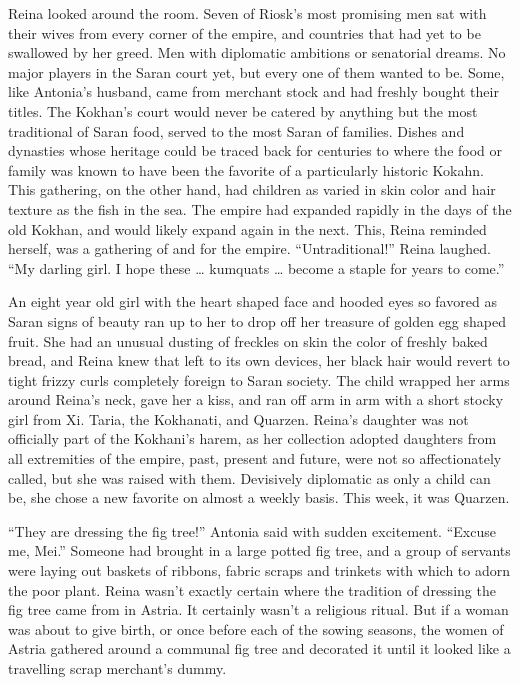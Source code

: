 \documentclass{article}
\begin{document}
	Reina looked around the room. Seven of Riosk’s most promising men sat with their wives from every corner of the empire, and countries that had yet to be swallowed by her greed. Men with diplomatic ambitions or senatorial dreams. No major players in the Saran court yet, but every one of them wanted to be. Some, like Antonia’s husband, came from merchant stock and had freshly bought their titles. The Kokhan’s court would never be catered by anything but the most traditional of Saran food, served to the most Saran of families. Dishes and dynasties whose heritage could be traced back for centuries to where the food or family was known to have been the favorite of a particularly historic Kokahn. This gathering, on the other hand, had children as varied in skin color and hair texture as the fish in the sea. The empire had expanded rapidly in the days of the old Kokhan, and would likely expand again in the next. This, Reina reminded herself, was a gathering of and for the empire. “Untraditional!” Reina laughed. “My darling girl. I hope these … kumquats … become a staple for years to come.”
	
	An eight year old girl with the heart shaped face and hooded eyes so favored as Saran signs of beauty ran up to her to drop off her treasure of golden egg shaped fruit. She had an unusual dusting of freckles on skin the color of freshly baked bread, and Reina knew that left to its own devices, her black hair would revert to tight frizzy curls completely foreign to Saran society. The child wrapped her arms around Reina’s neck, gave her a kiss, and ran off arm in arm with a short stocky girl from Xi. Taria, the Kokhanati, and Quarzen. Reina’s daughter was not officially part of the Kokhani’s harem, as her collection adopted daughters from all extremities of the empire, past, present and future, were not so affectionately called, but she was raised with them. Devisively diplomatic as only a child can be, she chose a new favorite on almost a weekly basis. This week, it was Quarzen.
	
	“They are dressing the fig tree!” Antonia said with sudden excitement. “Excuse me, Mei.”  Someone had brought in a large potted fig tree, and a group of servants were laying out baskets of ribbons, fabric scraps and trinkets with which to adorn the poor plant. Reina wasn’t exactly certain where the tradition of dressing the fig tree came from in Astria. It certainly wasn’t a religious ritual. But if a woman was about to give birth, or once before each of the sowing seasons, the women of Astria gathered around a communal fig tree and decorated it until it looked like a travelling scrap merchant’s dummy. 
	
\end{document}
